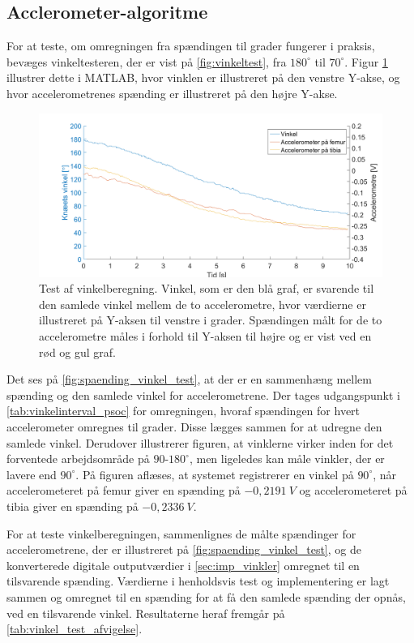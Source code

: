\subsection{Acclerometer-algoritme}

For at teste, om omregningen fra spændingen til grader fungerer i praksis, bevæges vinkeltesteren, der er vist på \autoref{fig:vinkeltest}, fra $180^{\circ}$ til $70^{\circ}$. Figur \ref{fig:spaending_vinkel_test} illustrer dette i MATLAB, hvor vinklen er illustreret på den venstre Y-akse, og hvor accelerometrenes spænding er illustreret på den højre Y-akse.

\begin{figure}[H]
\centering
\includegraphics[width=1\textwidth]{figures/spaending_vinkel_test}
\caption{Test af vinkelberegning. Vinkel, som er den blå graf, er svarende til den samlede vinkel mellem de to accelerometre, hvor værdierne er illustreret på Y-aksen til venstre i grader. Spændingen målt for de to accelerometre måles i forhold til Y-aksen til højre og er vist ved en rød og gul graf.}
\label{fig:spaending_vinkel_test}
\end{figure}

\noindent
Det ses på \autoref{fig:spaending_vinkel_test}, at der er en sammenhæng mellem spænding og den samlede vinkel for accelerometrene. Der tages udgangspunkt i \autoref{tab:vinkelinterval_psoc} for omregningen, hvoraf spændingen for hvert accelerometer omregnes til grader. Disse lægges sammen for at udregne den samlede vinkel. Derudover illustrerer figuren, at vinklerne virker inden for det forventede arbejdsområde på $90$-$180^{\circ}$, men ligeledes kan måle vinkler, der er lavere end $90^{\circ}$. På figuren aflæses, at systemet registrerer en vinkel på $90^{\circ}$, når  accelerometeret på femur giver en spænding på $-0,2191~V$ og accelerometeret på tibia giver en spænding på $-0,2336~V$. 

For at teste vinkelberegningen, sammenlignes de målte spændinger for accelerometrene, der er illustreret på \autoref{fig:spaending_vinkel_test}, og de konverterede digitale outputværdier i \autoref{sec:imp_vinkler} omregnet til en tilsvarende spænding. Værdierne i henholdsvis test og implementering er lagt sammen og omregnet til en spænding for at få den samlede spænding der opnås, ved en tilsvarende vinkel. Resultaterne heraf fremgår på \autoref{tab:vinkel_test_afvigelse}.

